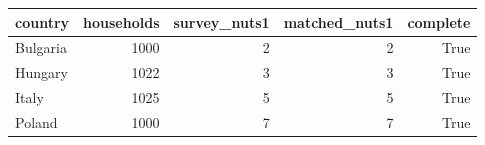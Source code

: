 \begin{tabular}{lrrrr}
\toprule
country & households & survey_nuts1 & matched_nuts1 & complete \\
\midrule
Bulgaria & 1000 & 2 & 2 & True \\
Hungary & 1022 & 3 & 3 & True \\
Italy & 1025 & 5 & 5 & True \\
Poland & 1000 & 7 & 7 & True \\
\bottomrule
\end{tabular}
